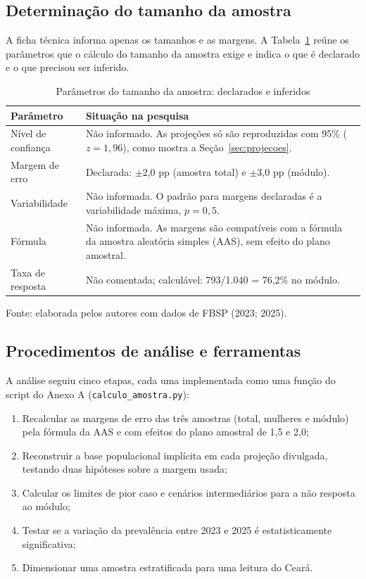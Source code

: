 \documentclass[12pt,a4paper]{article}
\newcommand{\fonte}[1]{%
  \vspace{-2mm}
  \begin{center}\footnotesize Fonte: #1\end{center}
}
\newcommand{\fontedados}{elaborada pelos autores com dados de FBSP (2023; 2025).}
\begin{document}
\subsection{Determinação do tamanho da amostra}

A ficha técnica informa apenas os tamanhos e as margens. A Tabela~\ref{tab:parametros} reúne os parâmetros que o cálculo do tamanho da amostra exige e indica o que é declarado e o que precisou ser inferido.

\begin{table}[H]
\centering
\caption{Parâmetros do tamanho da amostra: declarados e inferidos}
\label{tab:parametros}
\small
\begin{tabularx}{\textwidth}{lX}
\toprule
\textbf{Parâmetro} & \textbf{Situação na pesquisa} \\
\midrule
Nível de confiança & Não informado. As projeções só são reproduzidas com 95\% ($z = 1{,}96$), como mostra a Seção~\ref{sec:projecoes}. \\
Margem de erro & Declarada: $\pm$2,0 pp (amostra total) e $\pm$3,0 pp (módulo). \\
Variabilidade & Não informada. O padrão para margens declaradas é a variabilidade máxima, $p = 0{,}5$. \\
Fórmula & Não informada. As margens são compatíveis com a fórmula da amostra aleatória simples (AAS), sem efeito do plano amostral. \\
Taxa de resposta & Não comentada; calculável: 793/1.040 = 76,2\% no módulo. \\
\bottomrule
\end{tabularx}
\fonte{\fontedados}
\end{table}

\subsection{Procedimentos de análise e ferramentas}

A análise seguiu cinco etapas, cada uma implementada como uma função do script do Anexo A (\texttt{calculo\_amostra.py}):

\begin{enumerate}
    \item Recalcular as margens de erro das três amostras (total, mulheres e módulo) pela fórmula da AAS e com efeitos do plano amostral de 1,5 e 2,0;
    \item Reconstruir a base populacional implícita em cada projeção divulgada, testando duas hipóteses sobre a margem usada;
    \item Calcular os limites de pior caso e cenários intermediários para a não resposta ao módulo;
    \item Testar se a variação da prevalência entre 2023 e 2025 é estatisticamente significativa;
    \item Dimensionar uma amostra estratificada para uma leitura do Ceará.
\end{enumerate}
\end{document}
